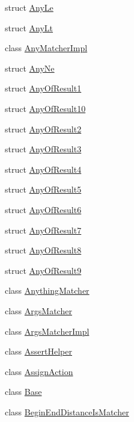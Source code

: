\begin{DoxyCompactItemize}
\item 
struct \hyperlink{structtesting_1_1internal_1_1AnyLe}{Any\+Le}
\item 
struct \hyperlink{structtesting_1_1internal_1_1AnyLt}{Any\+Lt}
\item 
class \hyperlink{classtesting_1_1internal_1_1AnyMatcherImpl}{Any\+Matcher\+Impl}
\item 
struct \hyperlink{structtesting_1_1internal_1_1AnyNe}{Any\+Ne}
\item 
struct \hyperlink{structtesting_1_1internal_1_1AnyOfResult1}{Any\+Of\+Result1}
\item 
struct \hyperlink{structtesting_1_1internal_1_1AnyOfResult10}{Any\+Of\+Result10}
\item 
struct \hyperlink{structtesting_1_1internal_1_1AnyOfResult2}{Any\+Of\+Result2}
\item 
struct \hyperlink{structtesting_1_1internal_1_1AnyOfResult3}{Any\+Of\+Result3}
\item 
struct \hyperlink{structtesting_1_1internal_1_1AnyOfResult4}{Any\+Of\+Result4}
\item 
struct \hyperlink{structtesting_1_1internal_1_1AnyOfResult5}{Any\+Of\+Result5}
\item 
struct \hyperlink{structtesting_1_1internal_1_1AnyOfResult6}{Any\+Of\+Result6}
\item 
struct \hyperlink{structtesting_1_1internal_1_1AnyOfResult7}{Any\+Of\+Result7}
\item 
struct \hyperlink{structtesting_1_1internal_1_1AnyOfResult8}{Any\+Of\+Result8}
\item 
struct \hyperlink{structtesting_1_1internal_1_1AnyOfResult9}{Any\+Of\+Result9}
\item 
class \hyperlink{classtesting_1_1internal_1_1AnythingMatcher}{Anything\+Matcher}
\item 
class \hyperlink{classtesting_1_1internal_1_1ArgsMatcher}{Args\+Matcher}
\item 
class \hyperlink{classtesting_1_1internal_1_1ArgsMatcherImpl}{Args\+Matcher\+Impl}
\item 
class \hyperlink{classtesting_1_1internal_1_1AssertHelper}{Assert\+Helper}
\item 
class \hyperlink{classtesting_1_1internal_1_1AssignAction}{Assign\+Action}
\item 
class \hyperlink{classtesting_1_1internal_1_1Base}{Base}
\item 
class \hyperlink{classtesting_1_1internal_1_1BeginEndDistanceIsMatcher}{Begin\+End\+Distance\+Is\+Matcher}

\end{DoxyCompactItemize}
